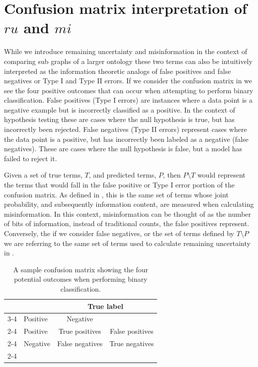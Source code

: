 \section{Confusion matrix interpretation of $ru$ and $mi$}
While we introduce remaining uncertainty and misinformation in the context of comparing sub graphs of a larger ontology these two terms can also be intuitively interpreted as the information theoretic analogs of false positives and false negatives or Type I and Type II errors.  If we consider the confusion matrix in  we see the four positive outcomes that can occur when attempting to perform binary classification.  False positives (Type I errors) are instances where a data point is a negative example but is incorrectly classified as a positive.  In the context of hypothesis testing these are cases where the null hypothesis is true, but has incorrectly been rejected.  False negatives (Type II errors) represent cases where the data point is a positive, but has incorrectly been labeled as a negative (false negatives).  These are cases where the null hypothesis is false, but a model has failed to reject it.  

Given a set of true terms, $T$, and predicted terms, $P$, then $P\setminus T$ would represent the terms that would fall in the false positive or Type I error portion of the confusion matrix.  As defined in , this is the same set of terms whose joint probability, and subsequently information content, are measured when calculating misinformation.  In this context, misinformation can be thought of as the number of bits of information, instead of traditional counts, the false positives represent. Conversely, the if we consider false negatives, or the set of terms defined by $T\setminus P$ we are referring to the same set of terms used to calculate remaining uncertainty in .  


\begin{table}[t]
\caption[A confusion matrix]{A sample confusion matrix showing the four potential outcomes when performing binary classification.
\label{tab:rumiCONF}}
{
\begin{tabular}{l|l|c|c|}
\multicolumn{2}{c}{}&\multicolumn{2}{c}{True label}\\
\cline{3-4}
\multicolumn{2}{c|}{}&Positive & Negative\\
\cline{2-4}
\multirow{2}{*}{Predicted label} & Positive & True positives & False positives\\
\cline{2-4} 
& Negative & False negatives & True negatives\\
\cline{2-4}
\end{tabular}}{}

\end{table}

